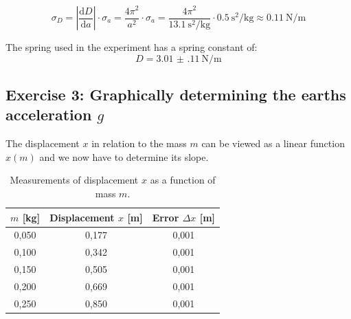 \begin{equation}
    \sigma_D = \left| \frac{\mathrm{d}D}{\mathrm{d}a} \right| \cdot \sigma_a = \frac{4\pi^2}{a^2} \cdot \sigma_a = \frac{4\pi^2}{\qty{13.1}{\second \squared \per \kilogram}} \cdot \qty{0.5}{\second \squared \per \kilogram} \approx \qty{0.11}{\newton \per \meter}
\end{equation}
\begin{resultbox}
    The spring used in the experiment has a spring constant of:
    \begin{equation}
        D = \qty{3.01(11)}{\newton \per \meter}
    \label{eq:ergebnis_federkonstante}
    \end{equation}
\end{resultbox}

\subsection{Exercise 3: Graphically determining the earths acceleration $g$}
The displacement $x$ in relation to the mass $m$ can be viewed as a linear function $x(m)$ and we now have to determine its slope.
\begin{table}[h!]
    \centering
    \begin{tabular}{c c c}
        \hline
        $m$ [kg] & Displacement $x$ [m] & Error $\Delta x$ [m] \\
        \hline
        0,050 & 0,177 & 0,001 \\
        0,100 & 0,342 & 0,001 \\
        0,150 & 0,505 & 0,001 \\
        0,200 & 0,669 & 0,001 \\
        0,250 & 0,850 & 0,001 \\
        \hline
    \end{tabular}
    \caption{Measurements of displacement $x$ as a function of mass $m$.}
    \label{tab:auslenkung_auswertung}
\end{table}

